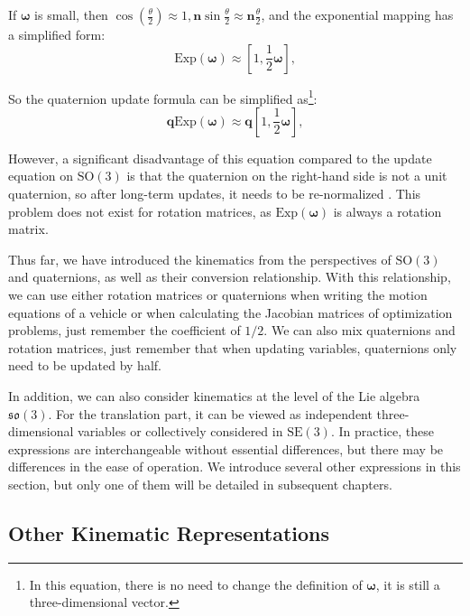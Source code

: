 If $\boldsymbol{\omega}$ is small, then $\cos(\frac{\theta}{2}) \approx 1, \mathbf{n} \sin \frac{\theta}{2} \approx \mathbf{n} \frac{\theta}{2}$, and the exponential mapping has a simplified form:
\begin{equation}\label{key}
	\mathrm{Exp}(\boldsymbol{\omega}) \approx [1, \frac{1}{2} \boldsymbol{\omega}],
\end{equation}

So the quaternion update formula can be simplified as\footnote{In this equation, there is no need to change the definition of $\boldsymbol{\omega}$, it is still a three-dimensional vector.}:
\begin{equation}\label{eq:2.76}
\mathbf{q} \mathrm{Exp}(\boldsymbol{\omega}) \approx \mathbf{q} [1, \frac{1}{2} \boldsymbol{\omega}],
\end{equation}

However, a significant disadvantage of this equation compared to the update equation on $\mathrm{SO}(3)$ is that the quaternion on the right-hand side is not a unit quaternion, so after long-term updates, it needs to be re-normalized \cite{Sola2017}. This problem does not exist for rotation matrices, as $\mathrm{Exp}(\boldsymbol{\omega})$ is always a rotation matrix.

Thus far, we have introduced the kinematics from the perspectives of $\mathrm{SO}(3)$ and quaternions, as well as their conversion relationship. With this relationship, we can use either rotation matrices or quaternions when writing the motion equations of a vehicle or when calculating the Jacobian matrices of optimization problems, just remember the coefficient of $1/2$. We can also mix quaternions and rotation matrices, just remember that when updating variables, quaternions only need to be updated by half.

In addition, we can also consider kinematics at the level of the Lie algebra $\mathfrak{so}(3)$. For the translation part, it can be viewed as independent three-dimensional variables or collectively considered in $\mathrm{SE}(3)$. In practice, these expressions are interchangeable without essential differences, but there may be differences in the ease of operation. We introduce several other expressions in this section, but only one of them will be detailed in subsequent chapters.

\subsection{Other Kinematic Representations}

